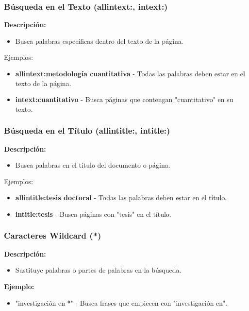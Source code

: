 \documentclass[
11pt, %
]{beamer}
\begin{document}
\begin{frame}
	\frametitle{Búsqueda en el Texto (allintext:, intext:)}
	\textbf{Descripción:}
	\begin{itemize}
		\item Busca palabras específicas dentro del texto de la página.
	\end{itemize}

	\begin{exampleblock}{Ejemplos:}
		\begin{itemize}
			\item \textbf{allintext:metodología cuantitativa} - Todas las palabras deben estar en el texto de la página.
			\item \textbf{intext:cuantitativo} - Busca páginas que contengan "cuantitativo" en su texto.
		\end{itemize}
	\end{exampleblock}

\end{frame}

\begin{frame}
	\frametitle{Búsqueda en el Título (allintitle:, intitle:)}
	\textbf{Descripción:}
	\begin{itemize}
		\item Busca palabras en el título del documento o página.
	\end{itemize}

	\begin{exampleblock}{Ejemplos:}
		\begin{itemize}
			\item \textbf{allintitle:tesis doctoral} - Todas las palabras deben estar en el título.
			\item \textbf{intitle:tesis} - Busca páginas con "tesis" en el título.
		\end{itemize}
	\end{exampleblock}
\end{frame}

\begin{frame}
	\frametitle{Caracteres Wildcard (*)}
	\textbf{Descripción:}
	\begin{itemize}
		\item Sustituye palabras o partes de palabras en la búsqueda.
	\end{itemize}
	\textbf{Ejemplo:}
	\begin{itemize}
		\item "investigación en *" - Busca frases que empiecen con "investigación en".
	\end{itemize}
\end{frame}
\end{document}
